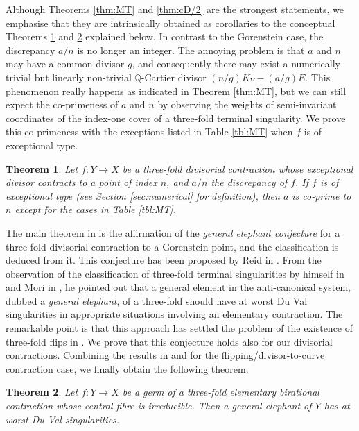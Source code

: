\documentclass[a4paper,11pt]{amsart}
\newtheorem{theorem}{Theorem}[section]
\theoremstyle{definition}
\theoremstyle{remark}
\numberwithin{equation}{section}
\newcommand{\bQ}{{\mathbb Q}}
\begin{document}
Although Theorems \ref{thm:MT} and \ref{thm:cD/2}
are the strongest statements,
we emphasise that they are intrinsically obtained as corollaries to
the conceptual Theorems \ref{thm:co-prime} and \ref{thm:GE} explained below.
In contrast to the Gorenstein case,
the discrepancy $a/n$ is no longer an integer.
The annoying problem is that
$a$ and $n$ may have a common divisor $g$,
and consequently there may exist
a numerically trivial but linearly non-trivial
$\bQ$-Cartier divisor $(n/g)K_Y-(a/g)E$.
This phenomenon really happens as indicated in Theorem \ref{thm:MT},
but we can still expect the co-primeness of $a$ and $n$
by observing the weights of semi-invariant coordinates
of the index-one cover of a three-fold terminal singularity.
We prove this co-primeness with the exceptions listed in Table \ref{tbl:MT}
when $f$ is of exceptional type.

\begin{theorem}\label{thm:co-prime}
Let $f \colon Y \to X$
be a three-fold divisorial contraction
whose exceptional divisor contracts to a point of index $n$,
and $a/n$ the discrepancy of $f$.
If $f$ is of exceptional type
\textup{(}see Section \textup{\ref{sec:numerical}} for definition\textup{)},
then $a$ is co-prime to $n$
except for the cases in Table \textup{\ref{tbl:MT}}.
\end{theorem}

The main theorem in \cite{Ka03} is
the affirmation of the \textit{general elephant conjecture}
for a three-fold divisorial contraction to a Gorenstein point,
and the classification is deduced from it.
This conjecture has been proposed by Reid in \cite{Re87}.
From the observation of the classification of
three-fold terminal singularities
by himself in \cite{Re83} and Mori in \cite{Mo85},
he pointed out that
a general element in the anti-canonical system,
dubbed a \textit{general elephant}, of a three-fold
should have at worst Du Val singularities
in appropriate situations involving an elementary contraction.
The remarkable point is that
this approach has settled the problem of the existence of three-fold flips
in \cite{Mo88}.
We prove that this conjecture holds also for our divisorial contractions.
Combining the results in \cite{KM92} and \cite{Mo88}
for the flipping/divisor-to-curve contraction case,
we finally obtain the following theorem.

\begin{theorem}\label{thm:GE}
Let $f \colon Y \to X$
be a germ of a three-fold elementary birational contraction
whose central fibre is irreducible.
Then a general elephant of $Y$ has at worst Du Val singularities.
\end{theorem}
\end{document}
